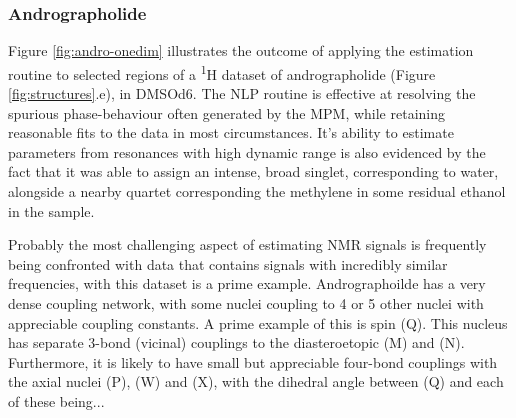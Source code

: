 \subsubsection{Andrographolide}
Figure \ref{fig:andro-onedim} illustrates the outcome of applying the
estimation routine to selected regions of a \textsuperscript{1}H dataset of
andrographolide (Figure \ref{fig:structures}.e), in \acs{DMSOd6}. The \ac{NLP}
routine is effective at resolving the spurious phase-behaviour often generated
by the \ac{MPM}, while retaining reasonable fits to the data in most
circumstances. It's ability to estimate parameters from resonances with high
dynamic range is also evidenced by the fact that it was able to assign an
intense, broad singlet, corresponding to water, alongside a nearby quartet
corresponding the methylene in some residual ethanol in the sample.

Probably the most challenging aspect of estimating \ac{NMR} signals is
frequently being confronted with data that contains signals with incredibly
similar frequencies, with this dataset is a prime example. Andrographoilde has
a very dense coupling network, with some nuclei coupling to 4 or 5 other nuclei
with appreciable coupling constants. A prime example of this is spin (Q). This nucleus has separate 3-bond (vicinal) couplings to the diasteroetopic (M) and (N). Furthermore, it is likely to have small but appreciable four-bond couplings with the axial nuclei (P), (W) and (X), with the dihedral angle between (Q) and each of these being...

